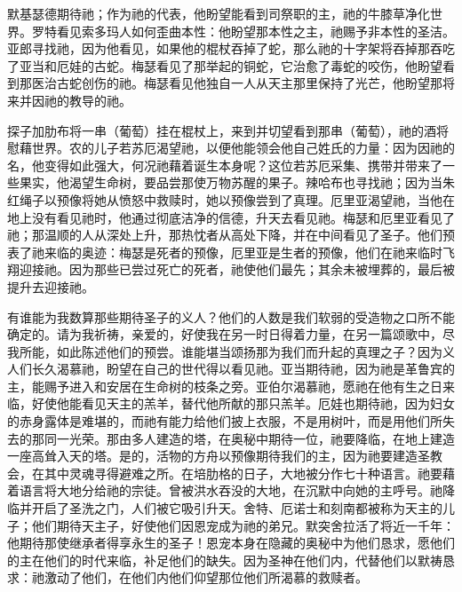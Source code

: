 默基瑟德期待祂；作为祂的代表，他盼望能看到司祭职的主，祂的牛膝草净化世界。罗特看见索多玛人如何歪曲本性：他盼望那本性之主，祂赐予非本性的圣洁。亚郎寻找祂，因为他看见，如果他的棍杖吞掉了蛇，那么祂的十字架将吞掉那吞吃了亚当和厄娃的古蛇。梅瑟看见了那举起的铜蛇，它治愈了毒蛇的咬伤，他盼望看到那医治古蛇创伤的祂。梅瑟看见他独自一人从天主那里保持了光芒，他盼望那将来并因祂的教导的祂。\par

探子加肋布将一串（葡萄）挂在棍杖上，来到并切望看到那串（葡萄），祂的酒将慰藉世界。农的儿子若苏厄渴望祂，以便他能领会他自己姓氏的力量：因为因祂的名，他变得如此强大，何况祂藉着诞生本身呢？这位若苏厄采集、携带并带来了一些果实，他渴望生命树，要品尝那使万物苏醒的果子。辣哈布也寻找祂；因为当朱红绳子以预像将她从愤怒中救赎时，她以预像尝到了真理。厄里亚渴望祂，当他在地上没有看见祂时，他通过彻底洁净的信德，升天去看见祂。梅瑟和厄里亚看见了祂；那温顺的人从深处上升，那热忱者从高处下降，并在中间看见了圣子。他们预表了祂来临的奥迹：梅瑟是死者的预像，厄里亚是生者的预像，他们在祂来临时飞翔迎接祂。因为那些已尝过死亡的死者，祂使他们最先；其余未被埋葬的，最后被提升去迎接祂。\par

有谁能为我数算那些期待圣子的义人？他们的人数是我们软弱的受造物之口所不能确定的。请为我祈祷，亲爱的，好使我在另一时日得着力量，在另一篇颂歌中，尽我所能，如此陈述他们的预尝。谁能堪当颂扬那为我们而升起的真理之子？因为义人们长久渴慕祂，盼望在自己的世代得以看见祂。亚当期待祂，因为祂是革鲁宾的主，能赐予进入和安居在生命树的枝条之旁。亚伯尔渴慕祂，愿祂在他有生之日来临，好使他能看见天主的羔羊，替代他所献的那只羔羊。厄娃也期待祂，因为妇女的赤身露体是难堪的，而祂有能力给他们披上衣服，不是用树叶，而是用他们所失去的那同一光荣。那由多人建造的塔，在奥秘中期待一位，祂要降临，在地上建造一座高耸入天的塔。是的，活物的方舟以预像期待我们的主，因为祂要建造圣教会，在其中灵魂寻得避难之所。在培肋格的日子，大地被分作七十种语言。祂要藉着语言将大地分给祂的宗徒。曾被洪水吞没的大地，在沉默中向她的主呼号。祂降临并开启了圣洗之门，人们被它吸引升天。舍特、厄诺士和刻南都被称为天主的儿子；他们期待天主子，好使他们因恩宠成为祂的弟兄。默突舍拉活了将近一千年：他期待那使继承者得享永生的圣子！恩宠本身在隐藏的奥秘中为他们恳求，愿他们的主在他们的时代来临，补足他们的缺失。因为圣神在他们内，代替他们以默祷恳求：祂激动了他们，在他们内他们仰望那位他们所渴慕的救赎者。\par


